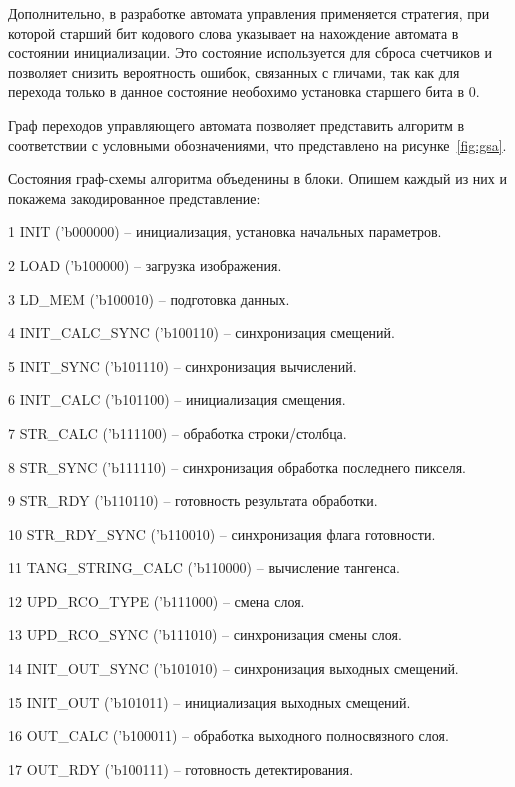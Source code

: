 Дополнительно, в разработке автомата управления применяется стратегия, при 
которой старший бит кодового слова указывает на нахождение автомата в состоянии
инициализации. Это состояние используется для сброса 
счетчиков и позволяет снизить вероятность ошибок, связанных с гличами, так как для перехода
только в данное состояние необохимо установка старшего бита в 0.

Граф переходов управляющего автомата позволяет представить 
алгоритм в соответствии с условными обозначениями, что представлено 
на рисунке~\ref{fig:gsa}.


Состояния граф-схемы алгоритма объеденины в блоки. Опишем каждый из них и
покажема закодированное представление:

  1 {INIT} ('b000000) – инициализация, установка начальных параметров.

  2 {LOAD} ('b100000) – загрузка изображения.

  3 {LD\_MEM} ('b100010) – подготовка данных.

  4 {INIT\_CALC\_SYNC} ('b100110) – синхронизация смещений.

  5 {INIT\_SYNC} ('b101110) – синхронизация вычислений.

  6 {INIT\_CALC} ('b101100) – инициализация смещения.

  7 {STR\_CALC} ('b111100) – обработка строки/столбца.

  8 {STR\_SYNC} ('b111110) – синхронизация обработка последнего пикселя.

  9 {STR\_RDY} ('b110110) – готовность результата обработки.

  10 {STR\_RDY\_SYNC} ('b110010) – синхронизация флага готовности.

  11 {TANG\_STRING\_CALC} ('b110000) – вычисление тангенса.

  12 {UPD\_RCO\_TYPE} ('b111000) – смена слоя.

  13 {UPD\_RCO\_SYNC} ('b111010) – синхронизация смены слоя.

  14 {INIT\_OUT\_SYNC} ('b101010) – синхронизация выходных смещений.

  15 {INIT\_OUT} ('b101011) – инициализация выходных смещений.

  16 {OUT\_CALC} ('b100011) – обработка выходного полносвязного слоя.

  17 {OUT\_RDY} ('b100111) – готовность детектирования.

  
